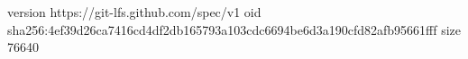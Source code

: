 version https://git-lfs.github.com/spec/v1
oid sha256:4ef39d26ca7416cd4df2db165793a103cdc6694be6d3a190cfd82afb95661fff
size 76640
